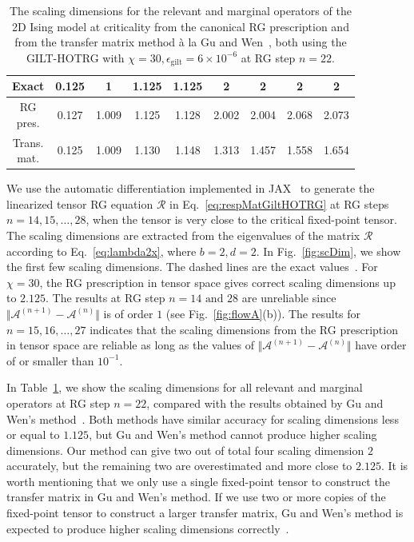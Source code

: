 \documentclass[aps,prr,reprint,superscriptaddress,floatfix]{revtex4-2}
\begin{document}
%
\begin{table}[tb]%
\caption{The scaling dimensions for the relevant and marginal operators
    of the 2D Ising model at criticality from the canonical RG prescription 
    and from the transfer matrix method \`a la Gu and
    Wen~\cite{GuWen2009}, both using the GILT-HOTRG with $\chi = 30, \epsilon_{\text{gilt}} =
    6\times 10^{-6}$ at RG step $n = 22$.\label{table:scDim}} 
\begin{ruledtabular}
\begin{tabular}{ c c c c c c c c c }
Exact      & 0.125 & 1 & 1.125 & 1.125 & 2 & 2 & 2 & 2 \\
\hline
\thead{RG\\ pres.} & 0.127 & 1.009 & 1.125 & 1.128 & 2.002 &
2.004 & 2.068 & 2.073 \\
\thead{Trans.\\ mat.} & 0.125 & 1.009 & 1.130 & 1.148 & 1.313 &
1.457 & 1.558 & 1.654
\end{tabular}
\end{ruledtabular}
\end{table}
%

We use the automatic differentiation implemented in JAX~\cite{jax2018github} to generate the linearized tensor RG equation $\mathcal{R}$ in Eq.~\eqref{eq:respMatGiltHOTRG} at RG steps $n = 14,15,\ldots, 28$, when the tensor is very close to the critical fixed-point tensor. 
The scaling dimensions are extracted from the eigenvalues of the matrix $\mathcal{R}$ according to Eq.~\eqref{eq:lambda2x}, where $b = 2, d = 2$. 
In Fig.~\ref{fig:scDim}, we show the first few scaling dimensions. 
The dashed lines are the exact values~\cite{DiFrancesco1997}. 
For $\chi = 30$, the RG prescription in tensor space gives correct scaling dimensions up to $2.125$. 
The results at RG step $n = 14 \text{ and } 28$ are unreliable since $\Vert \mathcal{A}^{(n+1)} - \mathcal{A}^{(n)}\Vert$ is of order $1$ (see Fig.~\ref{fig:flowA}(b)). 
The results for $n = 15,16,\ldots,27$ indicates that the scaling dimensions from the RG prescription in tensor space are reliable as long as the values of $\Vert \mathcal{A}^{(n+1)} - \mathcal{A}^{(n)}\Vert$ have order of or smaller than $10^{-1}$. 
%

In Table~\ref{table:scDim}, we show the scaling dimensions for all relevant and marginal operators at RG step $n = 22$, compared with the results obtained by Gu and Wen's method~\cite{GuWen2009}. 
Both methods have similar accuracy for scaling dimensions less or equal to $1.125$, but Gu and Wen's method cannot produce higher scaling dimensions. 
Our method can give two out of total four scaling dimension $2$ accurately, but the remaining two are overestimated and more close to $2.125$.
It is worth mentioning that we only use a single fixed-point tensor to construct the transfer matrix in Gu and Wen's method.
If we use two or more copies of the fixed-point tensor to construct a larger transfer matrix, Gu and Wen's method is expected to produce higher scaling dimensions correctly~\cite{looptnr}.
%
\end{document}
